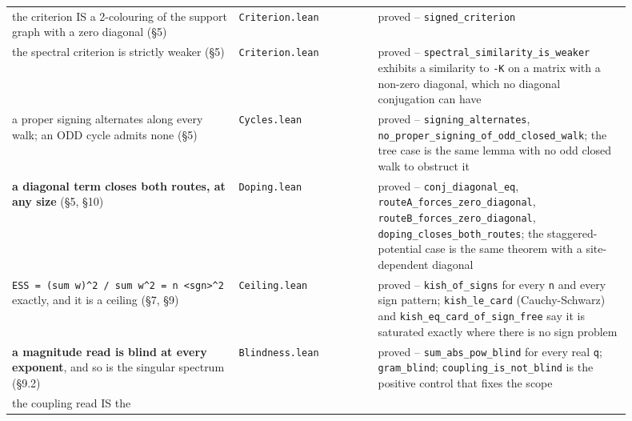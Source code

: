 \documentclass[10pt,letterpaper,twocolumn]{article}
\begin{document}
\begin{center}
{\begin{xtabular}{L{0.264\linewidth}L{0.228\linewidth}L{0.405\linewidth}}
the criterion IS a 2-colouring of the support graph with a zero diagonal
(§5) & \texttt{Criterion.\allowbreak{}lean} & proved -- \texttt{signed\_\allowbreak{}criterion} \\
the spectral criterion is strictly weaker (§5) & \texttt{Criterion.\allowbreak{}lean} & proved --
\texttt{spectral\_\allowbreak{}similarity\_\allowbreak{}is\_\allowbreak{}weaker}
exhibits a similarity to \texttt{-{}\allowbreak{}K} on a matrix with a
non-zero diagonal, which no diagonal conjugation can have \\
a proper signing alternates along every walk; an ODD cycle admits none
(§5) & \texttt{Cycles.\allowbreak{}lean} & proved -- \texttt{signing\_\allowbreak{}alternates},
\texttt{no\_\allowbreak{}proper\_\allowbreak{}signing\_\allowbreak{}of\_\allowbreak{}odd\_\allowbreak{}closed\_\allowbreak{}walk};
the tree case is the same lemma with no odd closed walk to obstruct it \\
\textbf{a diagonal term closes both routes, at any size} (§5, §10) & \texttt{Doping.\allowbreak{}lean} & proved -- \texttt{conj\_\allowbreak{}diagonal\_\allowbreak{}eq},
\texttt{routeA\_\allowbreak{}forces\_\allowbreak{}zero\_\allowbreak{}diagonal},
\texttt{routeB\_\allowbreak{}forces\_\allowbreak{}zero\_\allowbreak{}diagonal},
\texttt{doping\_\allowbreak{}closes\_\allowbreak{}both\_\allowbreak{}routes};
the staggered-potential case is the same theorem with a site-dependent
diagonal \\
\texttt{ESS\ =\allowbreak{}\ (\allowbreak{}sum\ w)\allowbreak{}\^{}2\ /\allowbreak{}\ sum\ w\^{}2\ =\allowbreak{}\ n\ \textless{}\allowbreak{}sgn\textgreater{}\allowbreak{}\^{}2}
exactly, and it is a ceiling (§7, §9) & \texttt{Ceiling.\allowbreak{}lean} & proved -- \texttt{kish\_\allowbreak{}of\_\allowbreak{}signs} for every
\texttt{n} and every sign pattern;
\texttt{kish\_\allowbreak{}le\_\allowbreak{}card} (Cauchy-Schwarz) and
\texttt{kish\_\allowbreak{}eq\_\allowbreak{}card\_\allowbreak{}of\_\allowbreak{}sign\_\allowbreak{}free}
say it is saturated exactly where there is no sign problem \\
\textbf{a magnitude read is blind at every exponent}, and so is the
singular spectrum (§9.2) & \texttt{Blindness.\allowbreak{}lean} & proved --
\texttt{sum\_\allowbreak{}abs\_\allowbreak{}pow\_\allowbreak{}blind} for
every real \texttt{q}; \texttt{gram\_\allowbreak{}blind};
\texttt{coupling\_\allowbreak{}is\_\allowbreak{}not\_\allowbreak{}blind}
is the positive control that fixes the scope \\
the coupling read IS the

\end{xtabular}}
\end{center}
\end{document}
